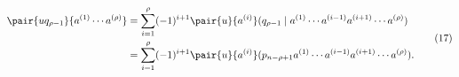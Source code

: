 \begin{equation}
\begin{aligned}
\pair{u q_{\rho-1}}{a^{(1)}\cdots a^{(\rho)}}
 &=\sum_{i=1}^{\rho}(-1)^{i+1}\pair{u}{a^{(i)}}(q_{\rho-1}\mid a^{(1)}\cdots a^{(i-1)}a^{(i+1)}\cdots a^{(\rho)})\\
 &=\sum_{i=1}^{\rho}(-1)^{i+1}\pair{u}{a^{(i)}}(p_{n-\rho+1}a^{(1)}\cdots a^{(i-1)}a^{(i+1)}\cdots a^{(\rho)}).
\end{aligned}
\tag{17}
\end{equation}
